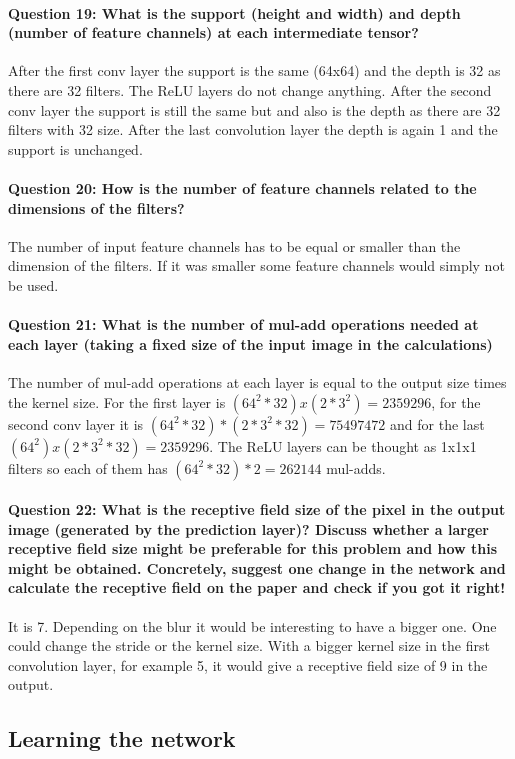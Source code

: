 \documentclass[12pt]{article}
\begin{document}
\paragraph{Question 19: What is the support (height and width) and depth (number of feature channels) at each intermediate tensor?} After the first conv layer the support is the same (64x64) and the depth is 32 as there are 32 filters. The ReLU layers do not change anything. After the second conv layer the support is still the same but and also is the depth as there are 32 filters with 32 size. After the last convolution layer the depth is again 1 and the support is unchanged.
\paragraph{Question 20: How is the number of feature channels related to the dimensions of the filters?} The number of input feature channels has to be equal or smaller than the dimension of the filters. If it was smaller some feature channels would simply not be used.
\paragraph{Question 21: What is the number of mul-add operations needed at each layer (taking a fixed size of the input image in the calculations)} The number of mul-add operations at each layer is equal to the output size times the kernel size. For the first layer is \((64^2*32)x(2*3^2)=2359296\), for the second conv layer it is \((64^2*32)*(2*3^2*32)=75497472\) and for the last \((64^2)x(2*3^2*32)=2359296\). The ReLU layers can be thought as 1x1x1 filters so each of them has \((64^2*32)*2=262144\) mul-adds.
\paragraph{Question 22: What is the receptive field size of the pixel in the output image (generated by the prediction layer)? Discuss whether a larger receptive field size might be preferable for this problem and how this might be obtained. Concretely, suggest one change in the network and calculate the receptive field on the paper and check if you got it right!} It is 7. Depending on the blur it would be interesting to have a bigger one. One could change the stride or the kernel size. With a bigger kernel size in the first convolution layer, for example 5, it would give a receptive field size of 9 in the output.
\subsection{Learning the network}
\end{document}
